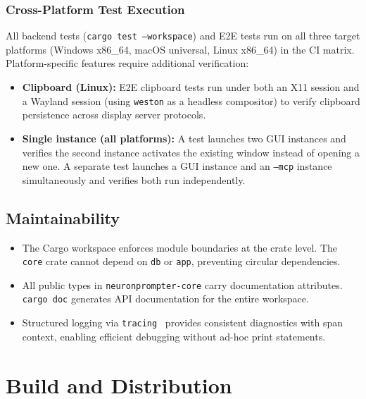\documentclass[a4paper, 11pt, oneside]{report}
\begin{document}
\subsection{Cross-Platform Test Execution}
\label{sec:cross-platform-tests}

All backend tests (\texttt{cargo test --workspace}) and E2E tests run
on all three target platforms (Windows x86\_64, macOS universal, Linux
x86\_64) in the CI matrix.  Platform-specific features require
additional verification:

\begin{itemize}
  \item \textbf{Clipboard (Linux):} E2E clipboard tests run under both
        an X11 session and a Wayland session (using \texttt{weston}
        as a headless compositor) to verify clipboard persistence
        across display server protocols.
  \item \textbf{Single instance (all platforms):} A test launches
        two GUI instances and verifies the second instance activates
        the existing window instead of opening a new one.  A
        separate test launches a GUI instance and an \texttt{--mcp}
        instance simultaneously and verifies both run independently.
\end{itemize}

\section{Maintainability}
\label{sec:maintainability}

\begin{itemize}
  \item The Cargo workspace enforces module boundaries at the crate level.
        The \texttt{core} crate cannot depend on \texttt{db} or
        \texttt{app}, preventing circular dependencies.
  \item All public types in \texttt{neuronprompter-core} carry documentation
        attributes.  \texttt{cargo doc} generates API documentation for
        the entire workspace.
  \item Structured logging via \texttt{tracing}~\cite{tracing} provides
        consistent diagnostics with span context, enabling efficient
        debugging without ad-hoc print statements.
\end{itemize}


\chapter{Build and Distribution}
\label{ch:build}
\end{document}
